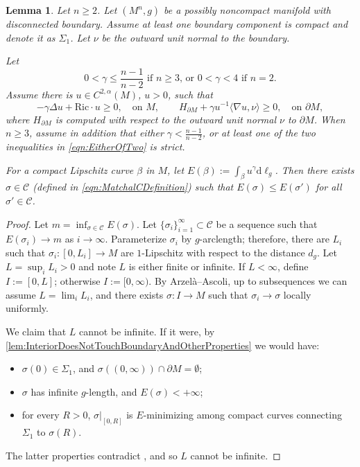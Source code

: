 \documentclass[12pt,a4paper,reqno]{amsart}
\newtheorem{lemma}{Lemma}
\theoremstyle{definition}
\renewcommand{\leq}{\leqslant}
\renewcommand{\geq}{\geqslant}
\begin{document}
{{\begin{lemma}\label{lem:existenceofminimizers}
Let $n\geq 2$. Let $(M^n,g)$ be a possibly noncompact manifold with disconnected boundary. Assume at least one boundary component is compact and denote it as $\Sigma_1$. Let $\nu$ be the outward unit normal to the boundary. 

Let 
\begin{equation}\label{eqn:AssumptionGammExistence}
\text{$0<\gamma\leq \frac{n-1}{n-2}$ if $n\geq 3$, or $0<\gamma<4$ if $n=2$}.
\end{equation}
Assume there is $u\in C^{2,\alpha}(M)$, $u>0$, such that 
        \begin{equation}\label{eqn:EitherOfTwo}
        -\gamma\Delta u+\mathrm{Ric}\cdot u \geq 0, \quad \text{on $M$}, \qquad H_{\partial M}+\gamma u^{-1}\langle \nabla u,\nu\rangle\geq 0, \quad \text{on $\partial M$},
        \end{equation}
where $H_{\partial M}$ is computed with respect to the outward unit normal $\nu$ to $\partial M$. When \(n\geq 3\), assume in addition that either
\(\gamma<\frac{n-1}{n-2}\), or at least one of the two inequalities in
\eqref{eqn:EitherOfTwo} is strict.

For a compact Lipschitz curve $\beta$ in $M$, let $E(\beta) := \int_\beta u^\gamma \mathrm{d}\ell_g$. Then there exists $\sigma\in \mathcal{C}$ (defined in \eqref{eqn:MatchalCDefinition}) such that $E(\sigma)\leq E(\sigma')$ for all $\sigma'\in \mathcal{C}$.
    
\end{lemma}
\begin{proof}
   Let $m=\inf_{\sigma\in \mathcal{C}} E(\sigma)$. Let $\{\sigma_i\}_{i=1}^\infty \subset \mathcal{C}$ be a sequence such that $E(\sigma_i) \to m$ as $i\to \infty$. Parameterize $\sigma_i$ by $g$-arclength; therefore, there are $L_i$ such that $\sigma_i:[0,L_i]\to M$ are $1$-Lipschitz with respect to the distance $d_g$. Let $L=\sup_i L_i>0$ and note $L$ is either finite or infinite. If $L<\infty$, define $I:=[0,L]$; otherwise $I:=[0,\infty)$. By Arzelà--Ascoli, up to subsequences we can assume $L=\lim_i L_i$, and there exists $\sigma:I\to M$ such that $\sigma_i\to\sigma$ locally uniformly. 

   We claim that $L$ cannot be infinite. If it were, by \cref{lem:InteriorDoesNotTouchBoundaryAndOtherProperties} we would have:
\begin{itemize}
    \item $\sigma(0)\in\Sigma_1$, and $\sigma((0,\infty))\cap \partial M = \emptyset$;
    \item $\sigma$ has infinite $g$-length, and $E(\sigma)<+\infty$;
    \item for every $R>0$, $\sigma|_{[0,R]}$ is $E$-minimizing among compact curves connecting $\Sigma_1$ to $\sigma(R)$.
\end{itemize}
The latter properties contradict , and so $L$ cannot be infinite.


\end{proof}}}
\end{document}
